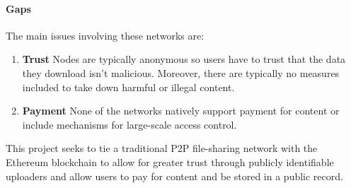 \paragraph*{Gaps}
The main issues involving these networks are:

\begin{enumerate}
  \item \textbf{Trust} Nodes are typically anonymous so users have to trust that the data they download isn't malicious. Moreover, there are typically no measures included to take down harmful or illegal content.
  \item \textbf{Payment} None of the networks natively support payment for content or include mechanisms for large-scale access control. 
\end{enumerate}

\newparagraph
This project seeks to tie a traditional P2P file-sharing network with the Ethereum blockchain to allow for greater trust through publicly identifiable uploaders and allow users to pay for content and be stored in a public record.